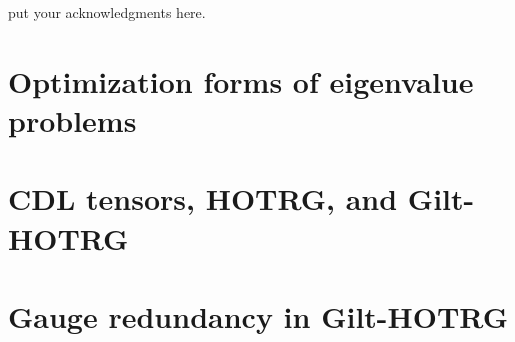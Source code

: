 \documentclass[aps,prb,reprint,superscriptaddress]{revtex4-2}
\begin{document}

%



\begin{acknowledgments}
 put your acknowledgments here.
\end{acknowledgments}

\appendix
\section{Optimization forms of eigenvalue problems\label{appd:opteig}}

\section{CDL tensors, HOTRG, and Gilt-HOTRG\label{appd:cdlHOTRG}}

\section{Gauge redundancy in Gilt-HOTRG\label{appd:gaugeFix}}


\end{document}

